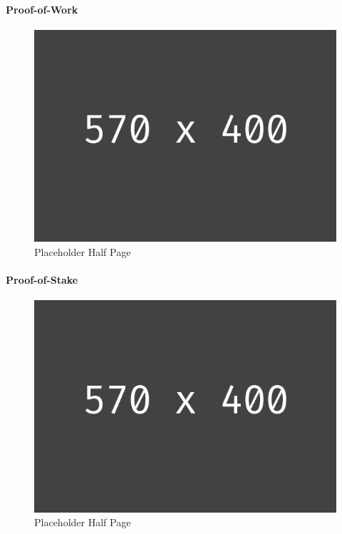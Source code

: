 \paragraph{Proof-of-Work}
\begin{figure}[h!]
	\centering
	\includegraphics[width=1.0\linewidth]{pictures/placeholder_half_page}
	\caption[Placeholder Half Page]{Placeholder Half Page}
	\label{fig:placeholder_half_page}
\end{figure}


\paragraph{Proof-of-Stake}
\begin{figure}[h!]
	\centering
	\includegraphics[width=1.0\linewidth]{pictures/placeholder_half_page}
	\caption[Placeholder Half Page]{Placeholder Half Page}
	\label{fig:placeholder_half_page}
\end{figure}


